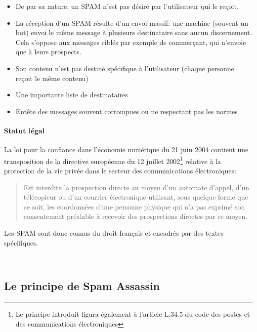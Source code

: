 \documentclass[a4paper,11pt]{report}
\begin{document}
\begin{itemize}
 \item De par sa nature, un SPAM n'est pas désiré par l'utilisateur qui le reçoit. 
 \item La réception d'un SPAM résulte d'un envoi massif: une machine (souvent un bot) envoi le même message 
 à plusieurs destinataire sans aucun discernement. Cela s'oppose aux messages ciblés par exemple de commerçant,
 qui n’envoie que à leurs prospects.
 \item Son contenu n'est pas destiné spécifique à l'utilisateur (chaque personne reçoit le même contenu)
 \item Une importante liste de destinataires 
 \item Entête des messages souvent corrompues ou ne respectant pas les normes
\end{itemize}

\paragraph{Statut légal}


La loi pour la confiance dans l'économie numérique du 21 juin 2004 contient une transposition de la
directive européenne du 12 juillet 2002\footnote{Le principe introduit figura également à l'article L.34.5 du code 
des postes et des communications électroniques } relative à la protection de la vie privée dans le secteur des communications
électroniques:
\begin{quote}
 Est interdite la prospection directe au moyen d'un automate d'appel, d'un télécopieur ou d'un courrier électronique utilisant,
 sous quelque forme que ce soit, les coordonnées d'une personne physique qui n'a pas exprimé son consentement préalable à recevoir
 des prospections directes par ce moyen. 
\end{quote}
Les SPAM sont donc connus du droit français et encadrés par des textes spécifiques.

\

\subsection{Le principe de Spam Assassin}

\pagebreak

\appendix
\end{document}
